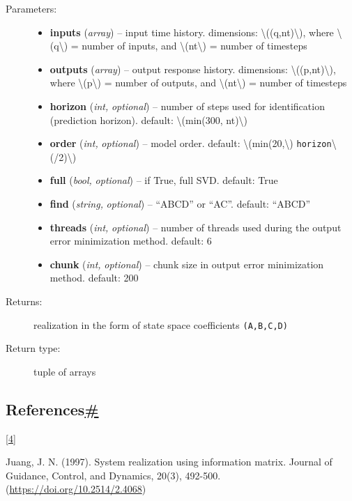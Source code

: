 \begin{description}
\begin{description}
\item[Parameters{:}]
\begin{itemize}
\item
  \textbf{inputs} (\emph{array}) -- input time history. dimensions:
  {\textbackslash{}((q,nt)\textbackslash{})}, where
  {\textbackslash{}(q\textbackslash{})} = number of inputs, and
  {\textbackslash{}(nt\textbackslash{})} = number of timesteps
\item
  \textbf{outputs} (\emph{array}) -- output response history.
  dimensions: {\textbackslash{}((p,nt)\textbackslash{})}, where
  {\textbackslash{}(p\textbackslash{})} = number of outputs, and
  {\textbackslash{}(nt\textbackslash{})} = number of timesteps
\item
  \textbf{horizon} (\emph{int,} \emph{optional}) -- number of steps used
  for identification (prediction horizon). default:
  {\textbackslash{}(min(300, nt)\textbackslash{})}
\item
  \textbf{order} (\emph{int,} \emph{optional}) -- model order. default:
  {\textbackslash{}(min(20,\textbackslash{})}
  \texttt{horizon}{\textbackslash{}(/2)\textbackslash{})}
\item
  \textbf{full} (\emph{bool,} \emph{optional}) -- if True, full SVD.
  default: True
\item
  \textbf{find} (\emph{string,} \emph{optional}) -- ``ABCD'' or ``AC''.
  default: ``ABCD''
\item
  \textbf{threads} (\emph{int,} \emph{optional}) -- number of threads
  used during the output error minimization method. default: 6
\item
  \textbf{chunk} (\emph{int,} \emph{optional}) -- chunk size in output
  error minimization method. default: 200
\end{itemize}
\item[Returns{:}]
realization in the form of state space coefficients \texttt{(A,B,C,D)}
\item[Return type{:}]
tuple of arrays
\end{description}

\hypertarget{id9}{}
\hypertarget{references-2}{%
\subsection{\texorpdfstring{References\protect\hyperlink{id9}{\#}}{References\#}}\label{references-2}}

{{{[}}\protect\hyperlink{id8}{4}{{]}}}

Juang, J. N. (1997). System realization using information matrix.
Journal of Guidance, Control, and Dynamics, 20(3), 492-500.
(\url{https://doi.org/10.2514/2.4068})
\end{description}

